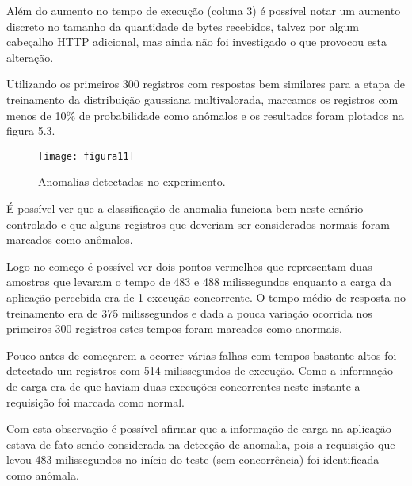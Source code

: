 Além do aumento no tempo de execução (coluna 3) é possível notar um aumento
discreto no tamanho da quantidade de bytes recebidos, talvez por algum
cabeçalho HTTP adicional, mas ainda não foi investigado o que provocou esta
alteração.

Utilizando os primeiros 300 registros com respostas bem similares para a etapa
de treinamento da distribuição gaussiana multivalorada, marcamos os registros
com menos de 10\% de probabilidade como anômalos e os resultados foram plotados
na figura 5.3.

\begin{figure}
  \centering
  \texttt{[image: figura11]}
  \caption{Anomalias detectadas no experimento.\label{fig:anomalias-detectadas-no-experimento}}
\end{figure}

É possível ver que a classificação de anomalia funciona bem neste cenário controlado
e que alguns registros que deveriam ser considerados normais foram marcados como
anômalos.

Logo no começo é possível ver dois pontos vermelhos que representam duas amostras
que levaram o tempo de 483 e 488 milissegundos enquanto a carga da aplicação
percebida era de 1 execução concorrente. O tempo médio de resposta no
treinamento era de 375 milissegundos e dada a pouca variação ocorrida nos
primeiros 300 registros estes tempos foram marcados como anormais.

Pouco antes de começarem a ocorrer várias falhas com tempos bastante altos foi
detectado um registros com 514 milissegundos de execução. Como a informação de
carga era de que haviam duas execuções concorrentes neste instante a requisição
foi marcada como normal.
 
Com esta observação é possível afirmar que a informação de carga na aplicação estava
de fato sendo considerada na detecção de anomalia, pois a requisição que levou 483
milissegundos no início do teste (sem concorrência) foi identificada como anômala.
